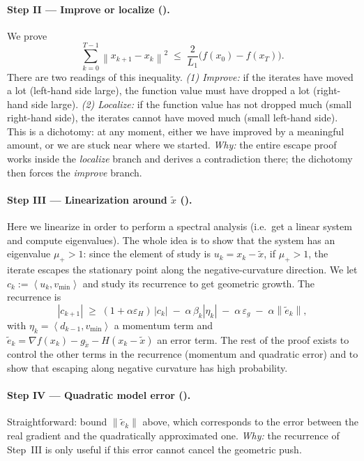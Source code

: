\documentclass[11pt,a4paper]{article}
\theoremstyle{plain}
\theoremstyle{definition}
\newcommand{\norm}[1]{\left\|#1\right\|}
\newcommand{\inner}[2]{\left\langle #1,#2 \right\rangle}
\newcommand{\eps}{\varepsilon}
\newcommand{\epsg}{\eps_{g}}
\newcommand{\epsH}{\eps_{H}}
\newcommand{\grad}{\nabla}
\newcommand{\Lone}{L_{1}}
\newcommand{\snap}{\tilde{x}}
\newcommand{\vmin}{v_{\min}}
\begin{document}
\paragraph{Step II --- Improve or localize ().}
We prove
\[
\sum_{k=0}^{T-1}\norm{x_{k+1}-x_{k}}^{2}
\;\le\; \frac{2}{\Lone}\bigl(f(x_{0})-f(x_{T})\bigr).
\]
There are two readings of this inequality.
\emph{(1) Improve:} if the iterates have moved a lot (left-hand side large), the
function value must have dropped a lot (right-hand side large).
\emph{(2) Localize:} if the function value has not dropped much (small right-hand
side), the iterates cannot have moved much (small left-hand side).
This is a dichotomy: at any moment, either we have improved by a meaningful amount,
or we are stuck near where we started.
\emph{Why:} the entire escape proof works inside the \emph{localize} branch and
derives a contradiction there; the dichotomy then forces the \emph{improve} branch.

\paragraph{Step III --- Linearization around $\snap$ ().}
Here we linearize in order to perform a spectral analysis (i.e.\ get a linear system
and compute eigenvalues). The whole idea is to show that the system has an eigenvalue
$\mu_{+}>1$: since the element of study is $u_{k}=x_{k}-\snap$, if $\mu_{+}>1$, the
iterate escapes the stationary point along the negative-curvature direction. We let
$c_{k}:=\inner{u_{k}}{\vmin}$ and study its recurrence to get geometric growth. The
recurrence is
\[
|c_{k+1}| \;\ge\; (1+\alpha\epsH)\,|c_{k}|
\;-\; \alpha\,\beta_{k}|\eta_{k}| \;-\; \alpha\,\epsg \;-\; \alpha\norm{\tilde e_{k}},
\]
with $\eta_{k}=\inner{d_{k-1}}{\vmin}$ a momentum term and
$\tilde e_{k}=\grad f(x_{k})-g_{\snap}-H(x_{k}-\snap)$ an error term. The rest of the
proof exists to control the other terms in the recurrence (momentum and quadratic
error) and to show that escaping along negative curvature has high probability.

\paragraph{Step IV --- Quadratic model error ().}
Straightforward: bound $\norm{\tilde e_{k}}$ above, which corresponds to the error
between the real gradient and the quadratically approximated one.
\emph{Why:} the recurrence of Step~III is only useful if this error cannot cancel
the geometric push.
\end{document}
